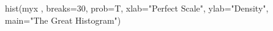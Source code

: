 \begin{Schunk}
\begin{Sinput}
 hist(myx , breaks=30, prob=T, xlab="Perfect Scale", ylab="Density", main="The Great Histogram")
\end{Sinput}
\end{Schunk}
